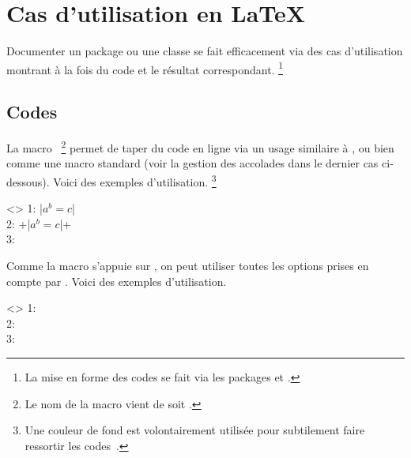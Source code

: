 \section{Cas d'utilisation en \LaTeX}
\label{tutodoc-listing-latex}

Documenter un package ou une classe se fait efficacement via des cas d'utilisation montrant à la fois du code et le résultat correspondant.%
\footnote{
    La mise en forme des codes se fait via les packages  et  .
}



\subsection{Codes }
\label{tutodoc-listing-latex-inline}

\begin{tdocexa}
    La macro \,%
    \footnote{
        Le nom de la macro  vient de  soit .
    }
    permet de taper du code en ligne via un usage similaire à , ou bien comme une macro standard (voir la gestion des accolades dans le dernier cas ci-dessous).
    Voici des exemples d'utilisation.%
    \footnote{
    	Une couleur de fond est volontairement utilisée pour subtilement faire ressortir les codes \tdoclatexin{\LaTeX}\,.
    }

    \begin{tdoclatex}<>
1: \tdoclatexin|$a^b = c$|               \\
2: \tdoclatexin+\tdoclatexin|$a^b = c$|+ \\
3: 
	\end{tdoclatex}
\end{tdocexa}


\begin{tdocexa}
    Comme la macro  s'appuie sur , on peut utiliser toutes les options prises en compte par .
    Voici des exemples d'utilisation.

    \begin{tdoclatex}<>
1:              \\
2:  \\
3: 
	\end{tdoclatex}
\end{tdocexa}



